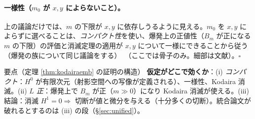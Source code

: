 \paragraph{一様性（$m_0$ が $x,y$ によらないこと）。}上の議論だけでは、$m$ の下限が $x,y$ に依存しうるように見える。$m_0$ を $x,y$ によらずに選べることは、\emph{コンパクト性}を使い、爆発上の正値性（$B_m$ が正になる $m$ の下限）の評価と消滅定理の適用が $x,y$ について一様にできることから従う（爆発の族について同じ議論をする）\tQ\ （ここでは骨子のみ。細部は文献）。\hfill$\square$

\begin{keybox}{要点（定理 \ref{thm:kodairaemb} の証明の構造）}
\textbf{仮定がどこで効くか}：(i) \emph{コンパクト}：$H^0$ が有限次元（射影空間への写像が定義される）、一様性、Kodaira 消滅。(ii) \emph{$L$ 正}：爆発上で $B_m$ が正（$m\gg0$）になり Kodaira 消滅が使える。(iii) 結論：消滅 $H^1=0\Rightarrow$ 切断が値と微分を与える（十分多くの切断）。統合論文が破れるとするのは (iii) の段（\S\ref{sec:unified}）。
\end{keybox}

